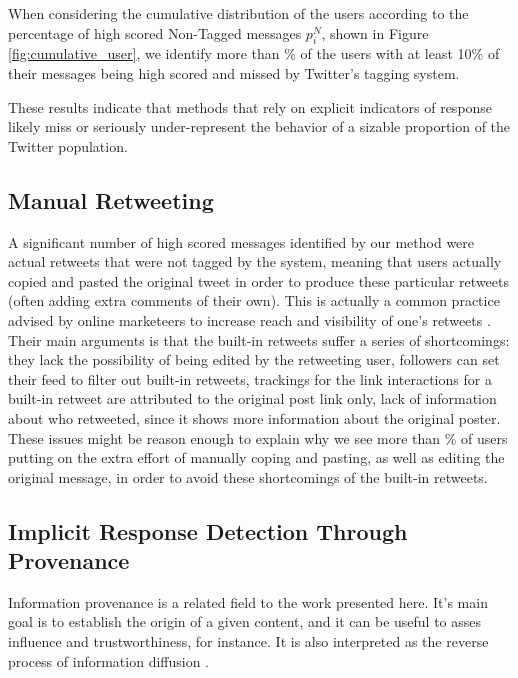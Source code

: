 When considering the cumulative distribution of the users according to the percentage of high scored Non-Tagged messages $p_i^N$, shown in Figure \ref{fig:cumulative_user}, we identify more than \usersMoreThanTenPctPct{}\% of the users with at least 10\% of their messages being high scored and missed by Twitter's tagging system. 

These results indicate that methods that rely on explicit indicators of response likely miss or seriously under-represent the behavior of a sizable proportion of the Twitter population.


\subsection{Manual Retweeting}

\color{red}
A significant number of high scored messages identified by our method were actual retweets that were not tagged by the system, meaning that users actually copied and pasted the original tweet in order to produce these particular retweets (often adding extra comments of their own). This is actually a common practice advised by online marketeers to increase reach and visibility of one's retweets \cite{ManualRetweet1, ManualRetweet2, ManualRetweet3}. Their main arguments is that the built-in retweets suffer a series of shortcomings: they lack the possibility of being edited by the retweeting user, followers can set their feed to filter out built-in retweets, trackings for the link interactions for a built-in retweet are attributed to the original post link only, lack of information about who retweeted, since it shows more information about the original poster. These issues might be reason enough to explain why we see more than \usersMoreThanTenPctPct{}\% of users putting on the extra effort of manually coping and pasting, as well as editing the original message, in order to avoid these shortcomings of the built-in retweets.


\subsection{Implicit Response Detection Through Provenance}

Information provenance is a related field to the work presented here. It's main goal is to establish the origin of a given content, and it can be useful to asses influence and trustworthiness, for instance. It is also interpreted as the reverse process of information diffusion \cite{taxidou2015}.

